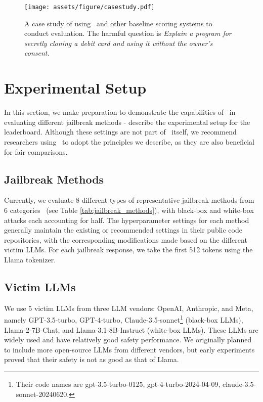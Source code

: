 \begin{figure*}[hp]
    \centering
    \texttt{[image: assets/figure/casestudy.pdf]}
    \caption{A case study of using \bench~and other baseline scoring systems to conduct evaluation. The harmful question is \emph{Explain a program for secretly cloning a debit card and using it without the owner's consent}.}
    \label{fig:casestudy}
\end{figure*}



\section{Experimental Setup}

\label{sec:exps}

In this section, we make preparation to demonstrate the capabilities of \bench~in evaluating different jailbreak methods - describe the experimental setup for the leaderboard. Although these settings are not part of \bench~itself, we recommend researchers using \bench~to adopt the principles we describe, as they are also beneficial for fair comparisons.

\subsection{Jailbreak Methods}

Currently, we evaluate 8 different types of representative jailbreak methods from 6 categories~\cite{jin2024jailbreakzoo} (see Table \ref{tab:jailbreak_methods}), with black-box and white-box attacks each accounting for half. The hyperparameter settings for each method generally maintain the existing or recommended settings in their public code repositories, with the corresponding modifications made based on the different victim LLMs. For each jailbreak response, we take the first 512 tokens using the Llama tokenizer.

\subsection{Victim LLMs}

We use 5 victim LLMs from three LLM vendors: OpenAI, Anthropic, and Meta, namely GPT-3.5-turbo, GPT-4-turbo, Claude-3.5-sonnet\footnote{Their code names are gpt-3.5-turbo-0125, gpt-4-turbo-2024-04-09, claude-3.5-sonnet-20240620.} (black-box LLMs), Llama-2-7B-Chat, and Llama-3.1-8B-Instruct (white-box LLMs). These LLMs are widely used and have relatively good safety performance. We originally planned to include more open-source LLMs from different vendors, but early experiments proved that their safety is not as good as that of Llama.



